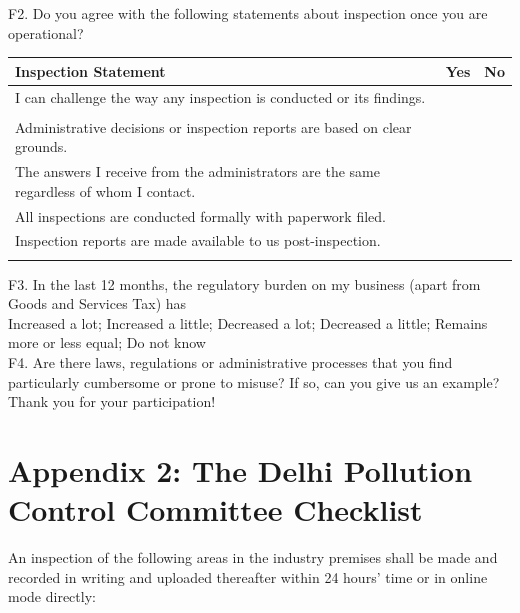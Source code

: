 \documentclass[a4paper, 12pt]{article}
\begin{document}
\begin{mdframed}[backgroundcolor=gray!20]
\begin{spacing}{0.5}
		
				
		F2. Do you agree with the following statements about inspection once you are operational? \\
		
		
		\begin{tabular}{p{7.5cm}p{3cm}p{3cm}}
		\toprule
		Inspection Statement & Yes & No \\
\midrule
I can challenge the way any inspection is conducted or its findings. \\
&  & \\
Administrative decisions or inspection reports are based on clear grounds. &  & \\
The answers I receive from the administrators are the same regardless of whom I contact. &  & \\
All inspections are conducted formally with paperwork filed. &  & \\
Inspection reports are made available to us post-inspection. &  & \\
\bottomrule\\
\end{tabular}
				
		{F3. In the last 12 months, the regulatory burden on my business (apart from Goods and Services Tax) has} \\
		
		Increased a lot; Increased a little; Decreased a lot; Decreased a little; Remains more or less equal; Do not know \\
		
		{F4. Are there laws, regulations or administrative processes that you find particularly cumbersome or prone to misuse? If so, can you give us an example?} \\
		
		Thank you for your participation!
		\end{spacing} 
		\end{mdframed}
		
		\newpage
		
		\section*{Appendix 2: The Delhi Pollution Control Committee Checklist}
		\normalsize
		
		An inspection of the following areas in the industry premises shall be made and recorded in writing and uploaded thereafter within 24 hours’ time or in online mode directly:
		
\end{document}
